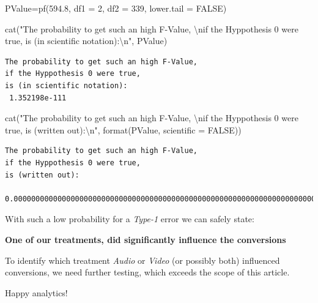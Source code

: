 \documentclass[
  letterpaper,
  DIV=11,
  numbers=noendperiod]{scrartcl}
\newenvironment{Shaded}{\begin{snugshade}}{\end{snugshade}}
\newcommand{\AttributeTok}[1]{\textcolor[rgb]{0.40,0.45,0.13}{#1}}
\newcommand{\ConstantTok}[1]{\textcolor[rgb]{0.56,0.35,0.01}{#1}}
\newcommand{\DecValTok}[1]{\textcolor[rgb]{0.68,0.00,0.00}{#1}}
\newcommand{\FloatTok}[1]{\textcolor[rgb]{0.68,0.00,0.00}{#1}}
\newcommand{\FunctionTok}[1]{\textcolor[rgb]{0.28,0.35,0.67}{#1}}
\newcommand{\NormalTok}[1]{\textcolor[rgb]{0.00,0.23,0.31}{#1}}
\newcommand{\OtherTok}[1]{\textcolor[rgb]{0.00,0.23,0.31}{#1}}
\newcommand{\SpecialCharTok}[1]{\textcolor[rgb]{0.37,0.37,0.37}{#1}}
\newcommand{\StringTok}[1]{\textcolor[rgb]{0.13,0.47,0.30}{#1}}
\begin{document}
\begin{Shaded}
\begin{Highlighting}[]
\NormalTok{PValue}\OtherTok{=}\FunctionTok{pf}\NormalTok{(}\FloatTok{594.8}\NormalTok{, }\AttributeTok{df1 =} \DecValTok{2}\NormalTok{, }\AttributeTok{df2 =} \DecValTok{339}\NormalTok{, }\AttributeTok{lower.tail =} \ConstantTok{FALSE}\NormalTok{)}
\end{Highlighting}
\end{Shaded}

\begin{Shaded}
\begin{Highlighting}[]
\FunctionTok{cat}\NormalTok{(}\StringTok{"The probability to get such an high F{-}Value, }\SpecialCharTok{\textbackslash{}n}\StringTok{if the Hyppothesis 0 were true,}
\StringTok{is (in scientific notation):}\SpecialCharTok{\textbackslash{}n}\StringTok{"}\NormalTok{, PValue)}
\end{Highlighting}
\end{Shaded}

\begin{verbatim}
The probability to get such an high F-Value, 
if the Hyppothesis 0 were true,
is (in scientific notation):
 1.352198e-111
\end{verbatim}

\begin{Shaded}
\begin{Highlighting}[]
\FunctionTok{cat}\NormalTok{(}\StringTok{"The probability to get such an high F{-}Value, }\SpecialCharTok{\textbackslash{}n}\StringTok{if the Hyppothesis 0 were true,}
\StringTok{is (written out):}\SpecialCharTok{\textbackslash{}n}\StringTok{"}\NormalTok{, }\FunctionTok{format}\NormalTok{(PValue, }\AttributeTok{scientific =} \ConstantTok{FALSE}\NormalTok{))}
\end{Highlighting}
\end{Shaded}

\begin{verbatim}
The probability to get such an high F-Value, 
if the Hyppothesis 0 were true,
is (written out):
 0.000000000000000000000000000000000000000000000000000000000000000000000000000000000000000000000000000000000000001352198
\end{verbatim}

With such a low probability for a \emph{Type-1} error we can safely
state:

\textbf{One of our treatments, did significantly influence the
conversions}

To identify which treatment \emph{Audio} or \emph{Video} (or possibly
both) influenced conversions, we need further testing, which exceeds the
scope of this article.

Happy analytics!
\end{document}
